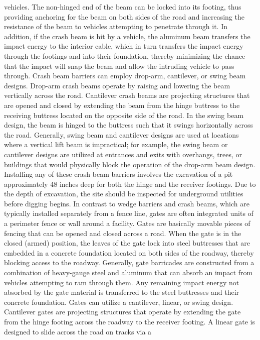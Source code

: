 \documentclass{article}
\begin{document}
vehicles. The non-hinged end of the beam can be locked into its footing,
thus providing anchoring for the beam on both sides of the road and
increasing the resistance of the beam to vehicles attempting to
penetrate through it. In addition, if the crash beam is hit by a
vehicle, the aluminum beam transfers the impact energy to the interior
cable, which in turn transfers the impact energy through the footings
and into their foundation, thereby minimizing the chance that the impact
will snap the beam and allow the intruding vehicle to pass through.
Crash beam barriers can employ drop-arm, cantilever, or swing beam
designs. Drop-arm crash beams operate by raising and lowering the beam
vertically across the road. Cantilever crash beams are projecting
structures that are opened and closed by extending the beam from the
hinge buttress to the receiving buttress located on the opposite side of
the road. In the swing beam design, the beam is hinged to the buttress
such that it swings horizontally across the road. Generally, swing beam
and cantilever designs are used at locations where a vertical lift beam
is impractical; for example, the swing beam or cantilever designs are
utilized at entrances and exits with overhangs, trees, or buildings that
would physically block the operation of the drop-arm beam design.
Installing any of these crash beam barriers involves the excavation of a
pit approximately 48 inches deep for both the hinge and the receiver
footings. Due to the depth of excavation, the site should be inspected
for underground utilities before digging begins. In contrast to wedge
barriers and crash beams, which are typically installed separately from
a fence line, gates are often integrated units of a perimeter fence or
wall around a facility. Gates are basically movable pieces of fencing
that can be opened and closed across a road. When the gate is in the
closed (armed) position, the leaves of the gate lock into steel
buttresses that are embedded in a concrete foundation located on both
sides of the roadway, thereby blocking access to the roadway. Generally,
gate barricades are constructed from a combination of heavy-gauge steel
and aluminum that can absorb an impact from vehicles attempting to ram
through them. Any remaining impact energy not absorbed by the gate
material is transferred to the steel buttresses and their concrete
foundation. Gates can utilize a cantilever, linear, or swing design.
Cantilever gates are projecting structures that operate by extending the
gate from the hinge footing across the roadway to the receiver footing.
A linear gate is designed to slide across the road on tracks via a
\end{document}
